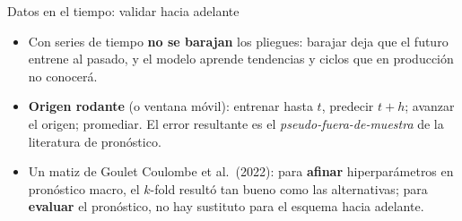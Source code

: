 \documentclass{beamer}
\newcommand{\1}{\mathbb{I}}
\begin{document}
\begin{frame}{Datos en el tiempo: validar hacia adelante}
\small
\begin{center}
\end{center}
\pause
\begin{itemize}\itemsep3pt
  \item Con series de tiempo \textbf{no se barajan} los pliegues: barajar deja que el futuro entrene al pasado, y el modelo aprende tendencias y ciclos que en producción no conocerá.
  \item \textbf{Origen rodante} (o ventana móvil): entrenar hasta $t$, predecir $t+h$; avanzar el origen; promediar. El error resultante es el \emph{pseudo-fuera-de-muestra} de la literatura de pronóstico. \pause
  \item Un matiz de Goulet Coulombe et al.\ (2022): para \textbf{afinar} hiperparámetros en pronóstico macro, el $k$-fold resultó tan bueno como las alternativas; para \textbf{evaluar} el pronóstico, no hay sustituto para el esquema hacia adelante.
\end{itemize}
\end{frame}
\end{document}
